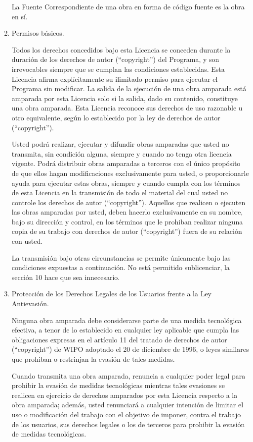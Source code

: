 \documentclass[11pt]{article}
\begin{document}
\begin{enumerate}
La Fuente Correspondiente de una obra en forma de c\'{o}digo fuente es la obra en s\'{i}.

\item Permisos b\'{a}sicos.

Todos los derechos concedidos bajo esta Licencia se conceden durante la duraci\'{o}n de los derechos de autor (``copyright'') del Programa, y son irrevocables siempre que se cumplan las condiciones establecidas. Esta Licencia afirma expl\'{i}citamente su ilimitado permiso para ejecutar el Programa sin modificar. La salida de la ejecuci\'{o}n de una obra amparada est\'{a} amparada por esta Licencia solo si la salida, dado su contenido, constituye una obra amparada. Esta Licencia reconoce sus derechos de uso razonable u otro equivalente, seg\'{u}n lo establecido por la ley de derechos de autor (``copyright'').

Usted podr\'{a} realizar, ejecutar y difundir obras amparadas que usted no transmita, sin condici\'{o}n alguna, siempre y cuando no tenga otra licencia vigente. Podr\'{a} distribuir obras amparadas a terceros con el \'{u}nico prop\'{o}sito de que ellos hagan modificaciones exclusivamente para usted, o proporcionarle ayuda para ejecutar estas obras, siempre y cuando cumpla con los t\'{e}rminos de esta Licencia en la transmisi\'{o}n de todo el material del cual usted no controle los derechos de autor (``copyright''). Aquellos que realicen o ejecuten las obras amparadas por usted, deben hacerlo exclusivamente en su nombre, bajo su direcci\'{o}n y control, en los t\'{e}rminos que le prohiban realizar ninguna copia de su trabajo con derechos de autor (``copyright'') fuera de su relaci\'{o}n con usted.

La transmisi\'{o}n bajo otras circunstancias se permite \'{u}nicamente bajo las condiciones expuestas a  continuaci\'{o}n. No est\'{a} permitido sublicenciar, la secci\'{o}n 10 hace que sea innecesario.

\item Protecci\'{o}n de los Derechos Legales de los Usuarios frente a la 
Ley Antievasi\'{o}n.

Ninguna obra amparada debe considerarse parte de una medida tecnol\'{o}gica 
efectiva, a tenor de lo establecido en cualquier ley aplicable que cumpla 
las obligaciones expresas en el art\'{i}culo 11 del tratado de derechos de autor (``copyright'') de WIPO 
adoptado el 20 de diciembre de 1996, o leyes similares que prohiban o 
restrinjan la evasi\'{o}n de tales medidas.

Cuando transmita una obra amparada, renuncia a cualquier poder legal 
para prohibir la evasi\'{o}n de medidas tecnol\'{o}gicas mientras tales evasiones 
se realicen en ejercicio de derechos amparados por esta Licencia respecto 
a la obra amparada; adem\'{a}s, usted renunciar\'{a} a cualquier intenci\'{o}n de 
limitar el uso o modificaci\'{o}n del trabajo con el objetivo de imponer, 
contra el trabajo de los usuarios, sus derechos legales o los de terceros 
para prohibir la evasi\'{o}n de medidas tecnol\'{o}gicas.


\end{enumerate}
\end{document}

